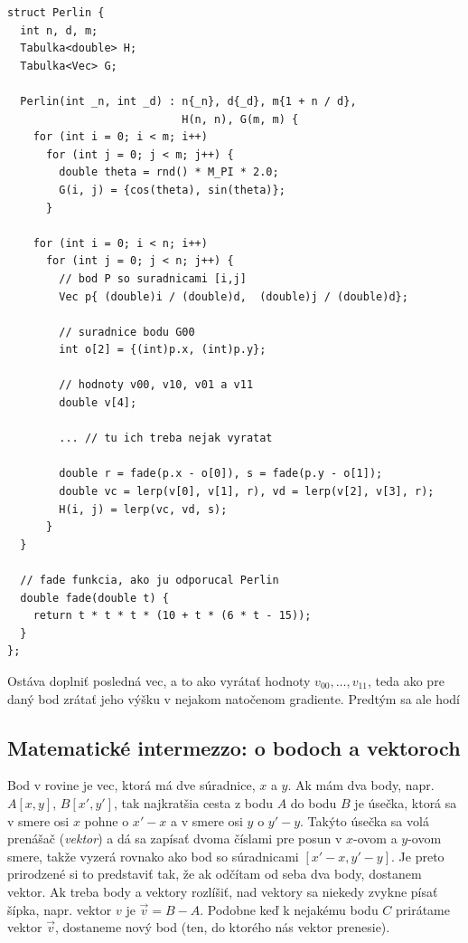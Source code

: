 \documentclass[10pt]{article}
\def\ods{\vspace*{10pt}}
\begin{document}
{\ods
\begin{lstlisting}
struct Perlin {
  int n, d, m;  
  Tabulka<double> H;
  Tabulka<Vec> G;

  Perlin(int _n, int _d) : n{_n}, d{_d}, m{1 + n / d}, 
                           H(n, n), G(m, m) {
    for (int i = 0; i < m; i++)
      for (int j = 0; j < m; j++) {
        double theta = rnd() * M_PI * 2.0;
        G(i, j) = {cos(theta), sin(theta)};
      }

    for (int i = 0; i < n; i++)
      for (int j = 0; j < n; j++) {
        // bod P so suradnicami [i,j]
        Vec p{ (double)i / (double)d,  (double)j / (double)d};

        // suradnice bodu G00
        int o[2] = {(int)p.x, (int)p.y}; 

        // hodnoty v00, v10, v01 a v11
        double v[4];

        ... // tu ich treba nejak vyratat
        
        double r = fade(p.x - o[0]), s = fade(p.y - o[1]);
        double vc = lerp(v[0], v[1], r), vd = lerp(v[2], v[3], r);
        H(i, j) = lerp(vc, vd, s);
      }
  }

  // fade funkcia, ako ju odporucal Perlin
  double fade(double t) {
    return t * t * t * (10 + t * (6 * t - 15));
  }
};
\end{lstlisting}

\ods
Ostáva doplniť posledná vec, a to ako vyrátať hodnoty $v_{00},\ldots,v_{11}$,
teda ako pre daný bod zrátať jeho výšku v nejakom natočenom gradiente. 
Predtým sa ale hodí

\subsection*{Matematické intermezzo: o bodoch a vektoroch}

Bod v rovine je vec, ktorá má dve súradnice, $x$ a $y$. Ak mám dva body, napr.
$A[x,y]$, $B[x',y']$, tak najkratšia cesta z bodu $A$ do bodu $B$ je úsečka, ktorá
sa v smere osi $x$ pohne o $x'-x$ a v smere osi $y$ o $y'-y$. Takýto úsečka
sa volá prenášač 
({\em vektor}) a dá sa zapísať dvoma číslami pre posun v $x$-ovom
a $y$-ovom smere, takže vyzerá
rovnako ako bod so súradnicami $[x'-x,y'-y]$. Je preto prirodzené
si to predstaviť tak, že ak odčítam od seba dva body, dostanem vektor.
Ak treba body a vektory rozlíšiť, nad vektory sa niekedy
zvykne písať šípka, napr. vektor $v$ je $\vec v = B-A$. 
Podobne keď k nejakému bodu $C$ prirátame vektor $\vec v$, 
dostaneme nový bod (ten, do ktorého nás
vektor prenesie).

}
\end{document}
